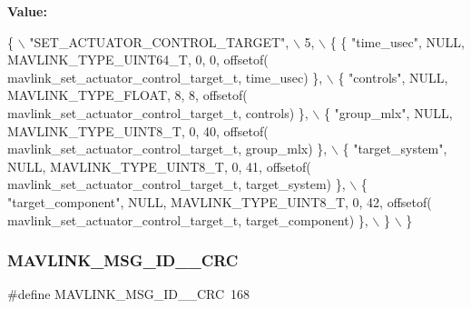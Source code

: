 {\bfseries Value\+:}
\begin{DoxyCode}
\{ \(\backslash\)
    \textcolor{stringliteral}{"SET\_ACTUATOR\_CONTROL\_TARGET"}, \(\backslash\)
    5, \(\backslash\)
    \{  \{ \textcolor{stringliteral}{"time\_usec"}, NULL, MAVLINK_TYPE_UINT64_T, 0, 0, offsetof(
      mavlink_set_actuator_control_target_t, time\_usec) \}, \(\backslash\)
         \{ \textcolor{stringliteral}{"controls"}, NULL, MAVLINK_TYPE_FLOAT, 8, 8, offsetof(
      mavlink_set_actuator_control_target_t, controls) \}, \(\backslash\)
         \{ \textcolor{stringliteral}{"group\_mlx"}, NULL, MAVLINK_TYPE_UINT8_T, 0, 40, offsetof(
      mavlink_set_actuator_control_target_t, group\_mlx) \}, \(\backslash\)
         \{ \textcolor{stringliteral}{"target\_system"}, NULL, MAVLINK_TYPE_UINT8_T, 0, 41, offsetof(
      mavlink_set_actuator_control_target_t, target\_system) \}, \(\backslash\)
         \{ \textcolor{stringliteral}{"target\_component"}, NULL, MAVLINK_TYPE_UINT8_T, 0, 42, offsetof(
      mavlink_set_actuator_control_target_t, target\_component) \}, \(\backslash\)
         \} \(\backslash\)
\}
\end{DoxyCode}
\mbox{\label{mavlink__msg__set__actuator__control__target_8h_a537c2ca83918004009801bf5622dff81}} 
\subsubsection{M\+A\+V\+L\+I\+N\+K\+\_\+\+M\+S\+G\+\_\+\+I\+D\+\_\+\_\+\+C\+RC}
{\footnotesize\ttfamily \#define M\+A\+V\+L\+I\+N\+K\+\_\+\+M\+S\+G\+\_\+\+I\+D\+\_\+\_\+\+C\+RC~168}

\mbox{\label{mavlink__msg__set__actuator__control__target_8h_af72a5ed7c9fa5c003d54a5cd45b55f8a}} 
